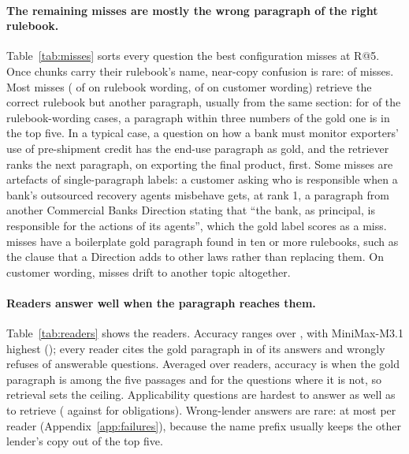 \documentclass[11pt]{article}
\begin{document}


\paragraph{The remaining misses are mostly the wrong paragraph of the right rulebook.} Table~\ref{tab:misses} sorts every question the best configuration misses at R@5. Once chunks carry their rulebook's name, near-copy confusion is rare: \MissNearCopy{} of \MissAll{} misses. Most misses (\MissOffRight{} of \MissOff{} on rulebook wording, \MissCustRight{} of \MissCust{} on customer wording) retrieve the correct rulebook but another paragraph, usually from the same section: for \MissOffNeighbour{} of the \MissOffRight{} rulebook-wording cases, a paragraph within three numbers of the gold one is in the top five. In a typical case, a question on how a bank must monitor exporters' use of pre-shipment credit has the end-use paragraph as gold, and the retriever ranks the next paragraph, on exporting the final product, first. Some misses are artefacts of single-paragraph labels: a customer asking who is responsible when a bank's outsourced recovery agents misbehave gets, at rank 1, a paragraph from another Commercial Banks Direction stating that ``the bank, as principal, is responsible for the actions of its agents'', which the gold label scores as a miss. \MissBoiler{} misses have a boilerplate gold paragraph found in ten or more rulebooks, such as the clause that a Direction adds to other laws rather than replacing them. On customer wording, \MissCustOffTopic{} misses drift to another topic altogether.



\paragraph{Readers answer well when the paragraph reaches them.} Table~\ref{tab:readers} shows the \NReaders{} readers. Accuracy ranges over \RdAccRange{}, with MiniMax-M3.1 highest (\RdTopAcc{}); every reader cites the gold paragraph in \RdCiteRange{} of its answers and wrongly refuses \RdFalseRefRange{} of answerable questions. Averaged over readers, accuracy is \RdGoldIn{} when the gold paragraph is among the five passages and \RdGoldOut{} for the \NGoldOut{} questions where it is not, so retrieval sets the ceiling. Applicability questions are hardest to answer as well as to retrieve (\RdApp{} against \RdObl{} for obligations). Wrong-lender answers are rare: at most \FailWLMax{} per reader (Appendix~\ref{app:failures}), because the name prefix usually keeps the other lender's copy out of the top five.
\end{document}
